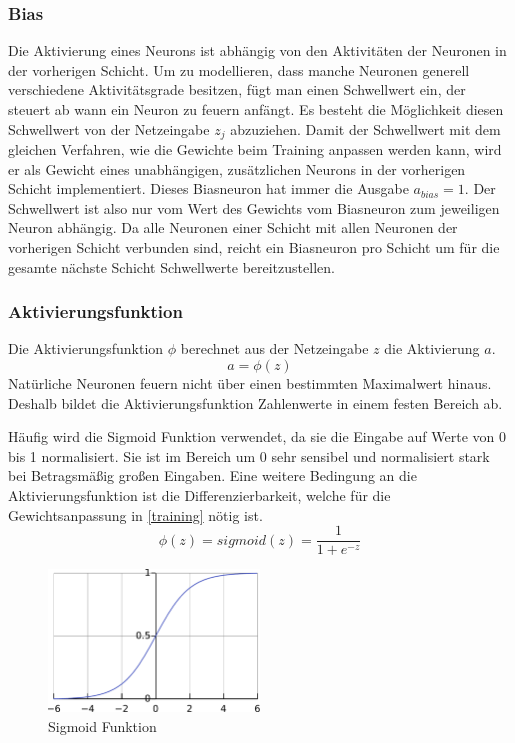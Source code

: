 \documentclass[12pt, a4paper]{article}
\begin{document}
\subsubsection{Bias}
Die Aktivierung eines Neurons ist abhängig von den Aktivitäten der Neuronen in der vorherigen Schicht. Um zu modellieren, dass manche Neuronen generell verschiedene Aktivitätsgrade besitzen, fügt man einen Schwellwert ein, der steuert ab wann ein Neuron zu feuern anfängt. Es besteht die Möglichkeit diesen Schwellwert von der Netzeingabe \(z_{j}\) abzuziehen. Damit der Schwellwert mit dem gleichen Verfahren, wie die Gewichte beim Training anpassen werden kann, wird er als Gewicht eines unabhängigen, zusätzlichen Neurons in der vorherigen Schicht implementiert. Dieses Biasneuron hat immer die Ausgabe \(a_{bias} = 1\). Der Schwellwert ist also nur vom Wert des Gewichts vom Biasneuron zum jeweiligen Neuron abhängig. Da alle Neuronen einer Schicht mit allen Neuronen der vorherigen Schicht verbunden sind, reicht ein Biasneuron pro Schicht um für die gesamte nächste Schicht Schwellwerte bereitzustellen.

\subsubsection{Aktivierungsfunktion}
Die Aktivierungsfunktion \(\phi\) berechnet aus der Netzeingabe \(z\) die Aktivierung \(a\). 
\[a = \phi(z) \]
Natürliche Neuronen feuern nicht über einen bestimmten Maximalwert hinaus.  Deshalb bildet die Aktivierungsfunktion Zahlenwerte in einem festen Bereich ab.

Häufig wird die Sigmoid Funktion verwendet, da sie die Eingabe auf Werte von 0 bis 1 normalisiert. Sie ist im Bereich um 0 sehr sensibel und normalisiert stark bei Betragsmäßig großen Eingaben. Eine weitere Bedingung an die Aktivierungsfunktion ist die Differenzierbarkeit, welche für die Gewichtsanpassung in \ref{training} nötig ist.
\[\phi(z) = sigmoid(z) = \frac{1}{1 + e^{-z}}\]

\begin{figure}
	\centering
	\includegraphics[width=0.5\textwidth]{Logistic-curve}
	\caption{Sigmoid Funktion\cite{img:wikipedia:sigmoid}}
\end{figure}
\end{document}
